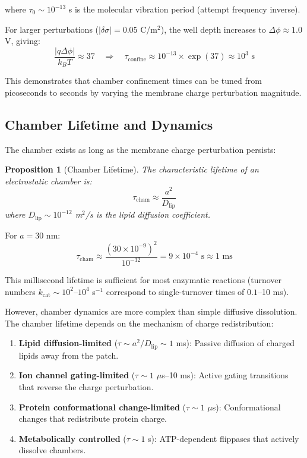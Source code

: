 \documentclass[twocolumn,10pt,aps,prd,superscriptaddress,floatfix,nofootinbib]{revtex4-2}
\newtheorem{proposition}[theorem]{Proposition}
\theoremstyle{remark}
\begin{document}
where $\tau_0 \sim 10^{-13}$ s is the molecular vibration period (attempt frequency inverse).

For larger perturbations ($|\delta\sigma| = 0.05$ C/m$^2$), the well depth increases to $\Delta\phi \approx 1.0$ V, giving:
\begin{equation}
\frac{|q\Delta\phi|}{k_B T} \approx 37 \quad \Rightarrow \quad \tau_{\mathrm{confine}} \approx 10^{-13} \times \exp(37) \approx 10^{3} \text{ s}
\end{equation}

This demonstrates that chamber confinement times can be tuned from picoseconds to seconds by varying the membrane charge perturbation magnitude.

\subsection{Chamber Lifetime and Dynamics}

The chamber exists as long as the membrane charge perturbation persists:

\begin{proposition}[Chamber Lifetime]
\label{prop:chamber_lifetime}
The characteristic lifetime of an electrostatic chamber is:
\begin{equation}
\tau_{\mathrm{cham}} \approx \frac{a^2}{D_{\mathrm{lip}}}
\label{eq:chamber_lifetime}
\end{equation}
where $D_{\mathrm{lip}} \sim 10^{-12}$ m$^2$/s is the lipid diffusion coefficient.
\end{proposition}

For $a = 30$ nm:
\begin{equation}
\tau_{\mathrm{cham}} \approx \frac{(30 \times 10^{-9})^2}{10^{-12}} = 9 \times 10^{-4} \text{ s} \approx 1 \text{ ms}
\end{equation}

This millisecond lifetime is sufficient for most enzymatic reactions (turnover numbers $k_{\mathrm{cat}} \sim 10^{2}$--$10^{4}$ s$^{-1}$ correspond to single-turnover times of $0.1$--10 ms).

However, chamber dynamics are more complex than simple diffusive dissolution. The chamber lifetime depends on the mechanism of charge redistribution:

\begin{enumerate}
\item \textbf{Lipid diffusion-limited} ($\tau \sim a^2/D_{\mathrm{lip}} \sim 1$ ms): Passive diffusion of charged lipids away from the patch.

\item \textbf{Ion channel gating-limited} ($\tau \sim 1$ $\mu$s--10 ms): Active gating transitions that reverse the charge perturbation.

\item \textbf{Protein conformational change-limited} ($\tau \sim 1$ $\mu$s): Conformational changes that redistribute protein charge.

\item \textbf{Metabolically controlled} ($\tau \sim 1$ s): ATP-dependent flippases that actively dissolve chambers.
\end{enumerate}
\end{document}
